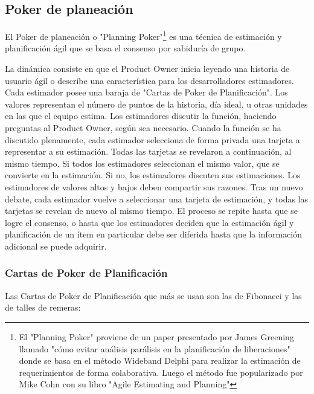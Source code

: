 \subsection{Poker de planeación}

El Poker de planeación o "Planning Poker"\footnote{El "Planning Poker" proviene de un paper presentado por James Greening llamado "cómo evitar análisis parálisis en la planificación de liberaciones"\cite{James-Grenning-2002} donde se basa en el método Wideband Delphi para realizar la estimación de requerimientos de forma colaborativa. Luego el método fue popularizado por Mike Cohn con su libro "Agile Estimating and Planning"\cite{Cohn-2005}} es una técnica de estimación y planificación ágil que se basa el consenso por sabiduría de grupo. 

La dinámica consiste en que el Product Owner inicia leyendo una historia de usuario ágil o describe una característica para los desarrolladores estimadores. Cada estimador posee una baraja de "Cartas de Poker de Planificación". Los valores representan el número de puntos de la historia, día ideal, u otras unidades en las que el equipo estima. Los estimadores discutir la función, haciendo preguntas al Product Owner, según sea necesario. Cuando la función se ha discutido plenamente, cada estimador selecciona de forma privada una tarjeta a representar a su estimación. Todas las tarjetas se revelaron a continuación, al mismo tiempo. Si todos los estimadores seleccionan el mismo valor, que se convierte en la estimación. Si no, los estimadores discuten sus estimaciones. Los estimadores de valores altos y bajos deben compartir sus razones. Tras un nuevo debate, cada estimador vuelve a seleccionar una tarjeta de estimación, y todas las tarjetas se revelan de nuevo al mismo tiempo. El proceso se repite hasta que se logre el consenso, o hasta que los estimadores deciden que la estimación ágil y planificación de un ítem en particular debe ser diferida hasta que la información adicional se puede adquirir.


\subsubsection{Cartas de Poker de Planificación}

Las Cartas de Poker de Planificación que más se usan son las de Fibonacci y las de talles de remeras:

